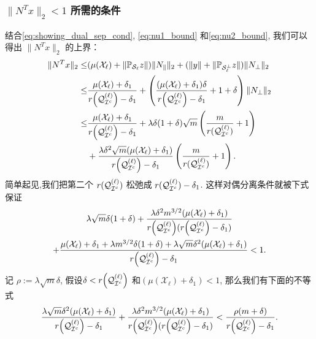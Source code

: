 \subsubsection{ \(\|N^T x\|_2<1\) 所需的条件}
结合\eqref{eq:showing_dual_sep_cond}, \eqref{eq:nu1_bound} 和\eqref{eq:nu2_bound},   
我们可以得出 \(\|N^T x\|_2\) 的上界：
\begin{align*}
  \|N^T x\|_2 \leq& (\mu(\mathcal{X}_{\ell})+\|\mathbb{P}_{\mathcal{S}_{\ell}}z\|) 
  \|N_{\parallel}\|_2+(\|y\|+\|\mathbb{P}_{\mathcal{S}_{\ell}^{\perp}}z\|)\|N_{\perp}\|_2\\
  \leq&\frac{\mu(\mathcal{X}_\ell)+\delta_1}{r{\left(\mathcal{Q}_{\mathcal{I}^c}^{(\ell)}\right)}-\delta_1}
  +\left(\frac{(\mu(\mathcal{X}_{\ell})+\delta_1)\delta}{r{\left( \mathcal{Q}_{\mathcal{I}^c}^{(\ell)}\right)}-\delta_1}+1+\delta\right)
  \|N_{\perp}\|_2\\
  \leq& \frac{\mu(\mathcal{X}_{\ell})+\delta_1}{r{\left( \mathcal{Q}_{\mathcal{I}^c}^{(\ell)}\right)}-\delta_1} +
  \lambda\delta(1+\delta)\sqrt{m}
  \left(\frac{m}{r(\mathcal{Q}_{\mathcal{I}^c}^{(\ell)})}+1\right) \\
  &+ \frac{\lambda\delta^2\sqrt{m}(\mu(\mathcal{X}_{\ell})+\delta_1)}
  {r{\left( \mathcal{Q}_{\mathcal{I}^c}^{(\ell)}\right)}-\delta_1}\left(\frac{m}{r(\mathcal{Q}_{\mathcal{I}^c}^{(\ell)})}+1\right).
\end{align*}
简单起见,我们把第二个 \(r(\mathcal{Q}_{\mathcal{I}^c}^{(\ell)})\) 松弛成 \(r(\mathcal{Q}_{\mathcal{I}^c}^{(\ell)})-\delta_1\).
这样对偶分离条件就被下式保证
\begin{multline}\label{eq:dual_cond_full}
   \lambda\sqrt{m}\delta(1+\delta)
  +\frac{\lambda\delta^2 m^{3/2}(\mu(\mathcal{X}_{\ell})+\delta_1)}
  {r{\left( \mathcal{Q}_{\mathcal{I}^c}^{(\ell)}\right)}(r{\left(
    \mathcal{Q}_{\mathcal{I}^c}^{(\ell)}\right)}-\delta_1)} \\
  +\frac{\mu(\mathcal{X}_{\ell})+\delta_1 +\lambda m^{3/2}\delta(1+\delta)+
  \lambda\sqrt{m}\delta^2(\mu(\mathcal{X}_{\ell})+\delta_1)}
  {r{\left( \mathcal{Q}_{\mathcal{I}^c}^{(\ell)}\right)}-\delta_1}<1.
\end{multline}
记 \(\rho:=\lambda\sqrt{m}\delta\), 假设\(\delta<r{\left(\mathcal{Q}_{\mathcal{I}^c}^{(\ell)}\right)}\)
和\((\mu(\mathcal{X}_{\ell})+\delta_1)<1\), 那么我们有下面的不等式
\begin{align*}
  \frac{\lambda\sqrt{m}\delta^2(\mu(\mathcal{X}_{\ell})+\delta_1)}
  {r{\left( \mathcal{Q}_{\mathcal{I}^c}^{(\ell)}\right)}-\delta_1}
  +\frac{\lambda\delta^2 m^{3/2}(\mu(\mathcal{X}_{\ell})+\delta_1)}
  {r{\left( \mathcal{Q}_{\mathcal{I}^c}^{(\ell)}\right)}(r{\left( \mathcal{Q}_{\mathcal{I}^c}^{(\ell)}\right)}-\delta_1)}
  < \frac{\rho (m+\delta)}{r{\left( \mathcal{Q}_{\mathcal{I}^c}^{(\ell)}\right)}-\delta_1}.
\end{align*}
